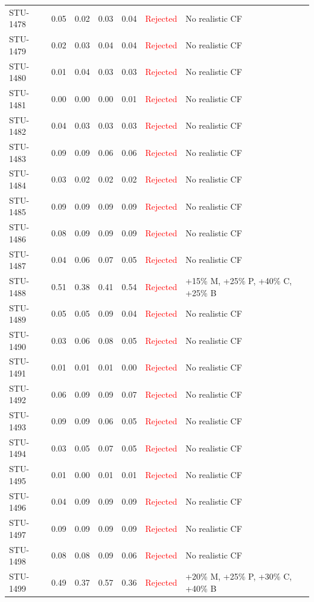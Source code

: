 \begin{longtable}{l c c c c | c | l}
STU-1478 & 0.05 & 0.02 & 0.03 & 0.04 & \textcolor{red}{Rejected} & No realistic CF \\
STU-1479 & 0.02 & 0.03 & 0.04 & 0.04 & \textcolor{red}{Rejected} & No realistic CF \\
STU-1480 & 0.01 & 0.04 & 0.03 & 0.03 & \textcolor{red}{Rejected} & No realistic CF \\
STU-1481 & 0.00 & 0.00 & 0.00 & 0.01 & \textcolor{red}{Rejected} & No realistic CF \\
STU-1482 & 0.04 & 0.03 & 0.03 & 0.03 & \textcolor{red}{Rejected} & No realistic CF \\
STU-1483 & 0.09 & 0.09 & 0.06 & 0.06 & \textcolor{red}{Rejected} & No realistic CF \\
STU-1484 & 0.03 & 0.02 & 0.02 & 0.02 & \textcolor{red}{Rejected} & No realistic CF \\
STU-1485 & 0.09 & 0.09 & 0.09 & 0.09 & \textcolor{red}{Rejected} & No realistic CF \\
STU-1486 & 0.08 & 0.09 & 0.09 & 0.09 & \textcolor{red}{Rejected} & No realistic CF \\
STU-1487 & 0.04 & 0.06 & 0.07 & 0.05 & \textcolor{red}{Rejected} & No realistic CF \\
STU-1488 & 0.51 & 0.38 & 0.41 & 0.54 & \textcolor{red}{Rejected} & +15\% M, +25\% P, +40\% C, +25\% B \\
STU-1489 & 0.05 & 0.05 & 0.09 & 0.04 & \textcolor{red}{Rejected} & No realistic CF \\
STU-1490 & 0.03 & 0.06 & 0.08 & 0.05 & \textcolor{red}{Rejected} & No realistic CF \\
STU-1491 & 0.01 & 0.01 & 0.01 & 0.00 & \textcolor{red}{Rejected} & No realistic CF \\
STU-1492 & 0.06 & 0.09 & 0.09 & 0.07 & \textcolor{red}{Rejected} & No realistic CF \\
STU-1493 & 0.09 & 0.09 & 0.06 & 0.05 & \textcolor{red}{Rejected} & No realistic CF \\
STU-1494 & 0.03 & 0.05 & 0.07 & 0.05 & \textcolor{red}{Rejected} & No realistic CF \\
STU-1495 & 0.01 & 0.00 & 0.01 & 0.01 & \textcolor{red}{Rejected} & No realistic CF \\
STU-1496 & 0.04 & 0.09 & 0.09 & 0.09 & \textcolor{red}{Rejected} & No realistic CF \\
STU-1497 & 0.09 & 0.09 & 0.09 & 0.09 & \textcolor{red}{Rejected} & No realistic CF \\
STU-1498 & 0.08 & 0.08 & 0.09 & 0.06 & \textcolor{red}{Rejected} & No realistic CF \\
STU-1499 & 0.49 & 0.37 & 0.57 & 0.36 & \textcolor{red}{Rejected} & +20\% M, +25\% P, +30\% C, +40\% B \\
\end{longtable}
